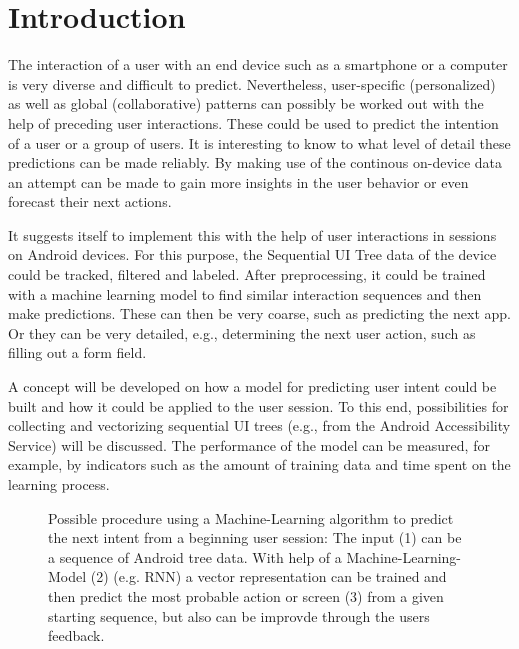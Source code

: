 \chapter{Introduction}
\label{sec:introduction}

The interaction of a user with an end device such as a smartphone or a computer is very diverse and difficult to predict.
Nevertheless, user-specific (personalized) as well as global (collaborative) patterns can possibly be worked out with the help of preceding user interactions.
These could be used to predict the intention of a user or a group of users.
It is interesting to know to what level of detail these predictions can be made reliably.
By making use of the continous on-device data an attempt can be made to gain more insights in the user behavior or even forecast their next actions.

It suggests itself to implement this with the help of user interactions in sessions on Android devices.
For this purpose, the Sequential UI Tree data of the device could be tracked, filtered and labeled.
After preprocessing, it could be trained with a machine learning model to find similar interaction sequences and then make predictions.
These can then be very coarse, such as predicting the next app.
Or they can be very detailed, e.g., determining the next user action, such as filling out a form field.

A concept will be developed on how a model for predicting user intent could be built and how it could be applied to the user session.
To this end, possibilities for collecting and vectorizing sequential UI trees (e.g., from the Android Accessibility Service) will be discussed.
The performance of the model can be measured, for example, by indicators such as the amount of training data and time spent on the learning process.

\begin{figure}[htbp!]
    \centering
    
    \caption[Schema of ML-algorithm predicting user intent]{
        Possible procedure using a Machine-Learning algorithm to predict the next intent from a beginning user session:
        The input (1) can be a sequence of Android tree data.
        With help of a Machine-Learning-Model (2) (e.g. RNN) a vector representation can be trained and then predict the most probable action or screen (3) from a given starting sequence, but also can be improvde through the users feedback.
    }
    \label{fig:encode-decode}
\end{figure}

